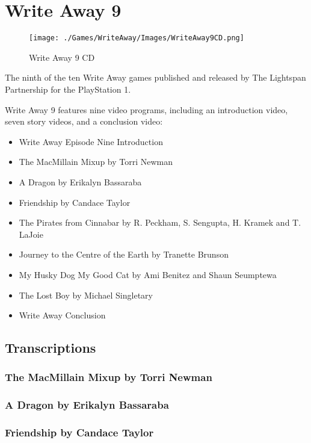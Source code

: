 \chapter{Write Away 9}

\begin{figure}[H]
    \centering
    \texttt{[image: ./Games/WriteAway/Images/WriteAway9CD.png]}
    \caption{Write Away 9 CD}
\end{figure}

The ninth of the ten Write Away games published and released by The Lightspan Partnership for the PlayStation 1.

Write Away 9 features nine video programs, including an introduction video, seven story videos, and a conclusion video:

\begin{itemize}
    \item Write Away Episode Nine Introduction
    \item The MacMillain Mixup by Torri Newman
    \item A Dragon by Erikalyn Bassaraba
    \item Friendship by Candace Taylor
    \item The Pirates from Cinnabar by R. Peckham, S. Sengupta, H. Kramek and T. LaJoie
    \item Journey to the Centre of the Earth by Tranette Brunson
    \item My Husky Dog My Good Cat by Ami Benitez and Shaun Seumptewa
    \item The Lost Boy by Michael Singletary
    \item Write Away Conclusion
\end{itemize}

\clearpage
\newpage

\section{Transcriptions}

\subsection{The MacMillain Mixup by Torri Newman}

\subsection{A Dragon by Erikalyn Bassaraba}

\subsection{Friendship by Candace Taylor}

